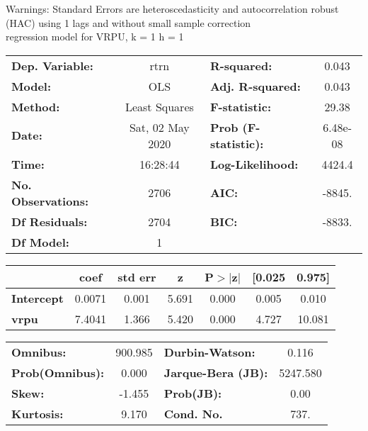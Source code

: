 Warnings: \newline
 [1] Standard Errors are heteroscedasticity and autocorrelation robust (HAC) using 1 lags and without small sample correction\\ 

regression model for VRPU, k = 1 h = 1\begin{center}
\begin{tabular}{lclc}
\toprule
\textbf{Dep. Variable:}    &       rtrn       & \textbf{  R-squared:         } &     0.043   \\
\textbf{Model:}            &       OLS        & \textbf{  Adj. R-squared:    } &     0.043   \\
\textbf{Method:}           &  Least Squares   & \textbf{  F-statistic:       } &     29.38   \\
\textbf{Date:}             & Sat, 02 May 2020 & \textbf{  Prob (F-statistic):} &  6.48e-08   \\
\textbf{Time:}             &     16:28:44     & \textbf{  Log-Likelihood:    } &    4424.4   \\
\textbf{No. Observations:} &        2706      & \textbf{  AIC:               } &    -8845.   \\
\textbf{Df Residuals:}     &        2704      & \textbf{  BIC:               } &    -8833.   \\
\textbf{Df Model:}         &           1      & \textbf{                     } &             \\
\bottomrule
\end{tabular}
\begin{tabular}{lcccccc}
                   & \textbf{coef} & \textbf{std err} & \textbf{z} & \textbf{P$> |$z$|$} & \textbf{[0.025} & \textbf{0.975]}  \\
\midrule
\textbf{Intercept} &       0.0071  &        0.001     &     5.691  &         0.000        &        0.005    &        0.010     \\
\textbf{vrpu}      &       7.4041  &        1.366     &     5.420  &         0.000        &        4.727    &       10.081     \\
\bottomrule
\end{tabular}
\begin{tabular}{lclc}
\textbf{Omnibus:}       & 900.985 & \textbf{  Durbin-Watson:     } &    0.116  \\
\textbf{Prob(Omnibus):} &   0.000 & \textbf{  Jarque-Bera (JB):  } & 5247.580  \\
\textbf{Skew:}          &  -1.455 & \textbf{  Prob(JB):          } &     0.00  \\
\textbf{Kurtosis:}      &   9.170 & \textbf{  Cond. No.          } &     737.  \\
\bottomrule
\end{tabular}
\end{center}


